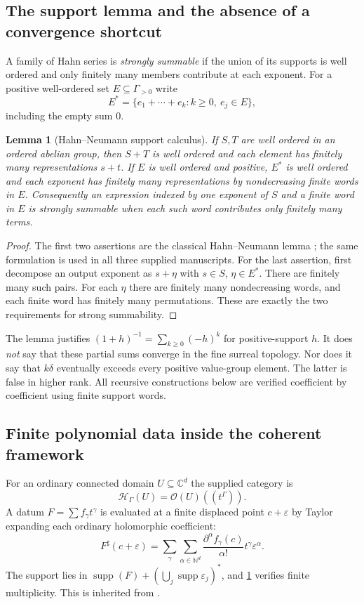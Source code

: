 \documentclass[11pt,letterpaper]{article}
\numberwithin{equation}{section}
\newtheorem{lemma}[lemma]{Lemma}
\theoremstyle{definition}
\theoremstyle{remark}
\newcommand{\C}{\mathbb C}
\newcommand{\N}{\mathbb N}
\newcommand{\OO}{\mathcal O}
\newcommand{\HH}{\mathcal H_\Gamma}
\newcommand{\sh}{^{\sharp}}
\newcommand{\supp}{\operatorname{supp}}
\begin{document}
\subsection{The support lemma and the absence of a convergence shortcut}
A family of Hahn series is \emph{strongly summable} if the union of its
supports is well ordered and only finitely many members contribute at each
exponent. For a positive well-ordered set $E\subseteq\Gamma_{>0}$ write
\[
 E^*=\{e_1+\cdots+e_k:k\ge0,\ e_j\in E\},
\]
including the empty sum $0$.

\begin{lemma}[Hahn--Neumann support calculus]\label{lem:support}
If $S,T$ are well ordered in an ordered abelian group, then $S+T$ is well
ordered and each element has finitely many representations $s+t$.
If $E$ is well ordered and positive, $E^*$ is well ordered and each exponent
has finitely many representations by nondecreasing finite words in $E$.
Consequently an expression indexed by one exponent of $S$ and a finite
word in $E$ is strongly summable when each such word contributes only
finitely many terms.
\end{lemma}
\begin{proof}
The first two assertions are the classical Hahn--Neumann lemma
\cite{Neumann}; the same formulation is used in all three supplied
manuscripts. For the last assertion, first decompose an output exponent as
$s+\eta$ with $s\in S$, $\eta\in E^*$. There are finitely many such pairs.
For each $\eta$ there are finitely many nondecreasing words, and each finite
word has finitely many permutations. These are exactly the two
requirements for strong summability.
\end{proof}

The lemma justifies $(1+h)^{-1}=\sum_{k\ge0}(-h)^k$ for positive-support
$h$. It does \emph{not} say that these partial sums converge in the fine
surreal topology. Nor does it say that $k\delta$ eventually exceeds every
positive value-group element. The latter is false in higher rank. All
recursive constructions below are verified coefficient by coefficient
using finite support words.

\subsection{Finite polynomial data inside the coherent framework}
For an ordinary connected domain $U\subseteq\C^d$ the supplied category is
\[
 \HH(U)=\OO(U)((t^\Gamma)).
\]
A datum $F=\sum f_\gamma t^\gamma$ is evaluated at a finite displaced point
$c+\varepsilon$ by Taylor expanding each ordinary holomorphic coefficient:
\begin{equation}\label{eq:coherentevaluation}
 F\sh(c+\varepsilon)=
 \sum_{\gamma}\sum_{\alpha\in\N^d}
 \frac{\partial^\alpha f_\gamma(c)}{\alpha!}
 t^\gamma\varepsilon^\alpha.
\end{equation}
The support lies in $\supp(F)+(\bigcup_j\supp\varepsilon_j)^*$, and
\cref{lem:support} verifies finite multiplicity. This is inherited from
\cite{SourceAnalysis,SourceResearch}.
\end{document}
